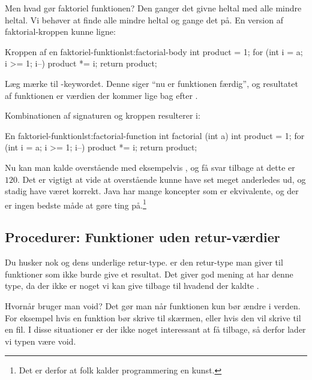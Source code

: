 		Men hvad gør faktoriel funktionen? Den ganger det givne heltal med alle mindre
		heltal. Vi behøver at finde alle mindre heltal og gange det på. En version
		af faktorial-kroppen kunne ligne:

		\begin{JavaCode}{Kroppen af en faktoriel-funktion}{lst:factorial-body}
			int product = 1;
			for (int i = a; i >= 1; i--)
				product *= i;
			return product;
		\end{JavaCode}

        Læg mærke til -keywordet. Denne siger ``nu
        er funktionen færdig'', og resultatet af funktionen er værdien
        der kommer lige bag efter .

		Kombinationen af signaturen og kroppen resulterer i:

		\begin{JavaCode}{En faktoriel-funktion}{lst:factorial-function}
			int factorial (int a) {
				int product = 1;
				for (int i = a; i >= 1; i--)
					product *= i;
				return product;
			}
		\end{JavaCode}

        Nu kan man kalde overstående med eksempelvis
        , og få svar tilbage at dette er
        \(120\). Det er vigtigt at vide at overstående kunne have set
        meget anderledes ud, og stadig have været korrekt. Java har
        mange koncepter som er ekvivalente, og der er ingen bedste
        måde at gøre ting på.\footnote{Det er derfor at folk kalder
        programmering en kunst.}


	\subsection{Procedurer: Funktioner uden retur-værdier}

        Du husker nok  og dens underlige
         retur-type.  er den
        retur-type man giver til funktioner som ikke burde give et
        resultat. Det giver god mening at  har denne
        type, da der ikke er noget vi kan give tilbage til hvadend der
        kaldte .

        Hvornår bruger man void? Det gør man når funktionen kun bør
        ændre i verden. For eksempel hvis en funktion bør skrive til
        skærmen, eller hvis den vil skrive til en fil. I disse
        situationer er der ikke noget interessant at få tilbage, så
        derfor lader vi typen være void.

